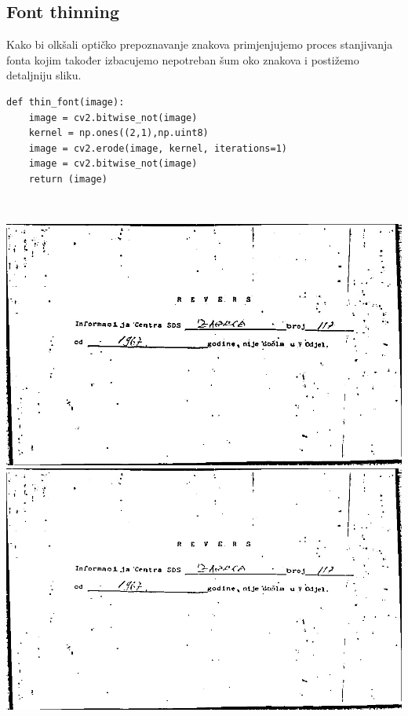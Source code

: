 \documentclass{article}
\begin{document}
\subsection{Font thinning}

Kako bi olkšali optičko prepoznavanje znakova primjenjujemo proces stanjivanja fonta kojim također izbacujemo nepotreban šum oko znakova i postižemo detaljniju sliku. %
\\

\begin{lstlisting}
def thin_font(image):
    image = cv2.bitwise_not(image)
    kernel = np.ones((2,1),np.uint8)
    image = cv2.erode(image, kernel, iterations=1)
    image = cv2.bitwise_not(image)
    return (image)
\end{lstlisting}
\\
\begin{center}
    \includegraphics[scale=0.2]{Z05353721_adatpive.jpg}
    \includegraphics[scale=0.2]{Z05353721_thin.jpg}
\end{center}
\end{document}
